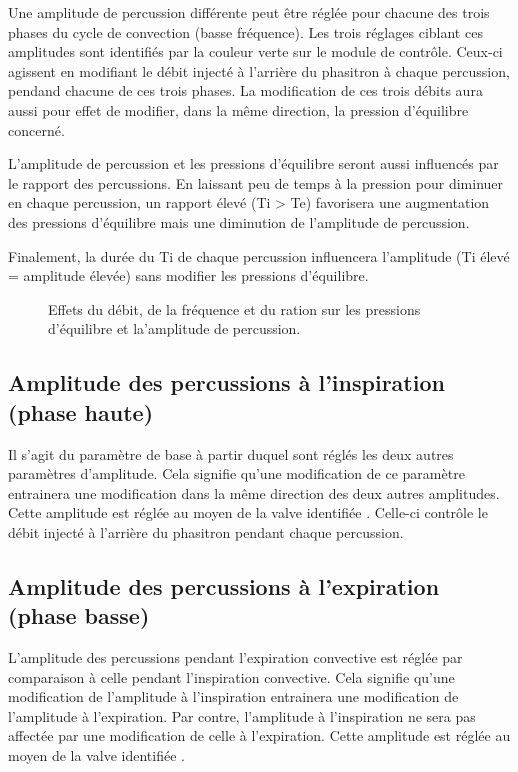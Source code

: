 Une amplitude de percussion différente peut être réglée pour chacune
	des trois phases du cycle de convection (basse fréquence). Les
	trois réglages ciblant ces amplitudes sont identifiés par la couleur
	verte sur le module de contrôle. Ceux-ci agissent en modifiant le
	débit injecté à l'arrière du phasitron à chaque percussion, pendand
	chacune de ces trois phases. La modification de ces trois débits
	aura aussi pour effet de modifier, dans la même direction, la
	pression d'équilibre concerné.

L'amplitude de percussion et les pressions d'équilibre seront aussi
	influencés par le rapport \ie des percussions. En laissant peu de
	temps à la pression pour diminuer en chaque percussion, un rapport
	\ie élevé (Ti > Te) favorisera une augmentation des pressions
	d'équilibre mais une diminution de l'amplitude de percussion.

Finalement, la durée du Ti de chaque percussion influencera
	l'amplitude (Ti élevé = amplitude élevée) sans modifier les
	pressions d'équilibre.

\begin{figure}
	\centering
	
	\caption{Effets du débit, de la fréquence et du ration \ie sur les
	pressions d'équilibre et la'amplitude de percussion.}
\end{figure}

\subsection{Amplitude des percussions à l'inspiration (phase haute)}

Il s'agit du paramètre de base à partir duquel sont réglés les deux
	autres paramètres d'amplitude. Cela signifie qu'une modification de
	ce paramètre entrainera une modification dans la même direction des
	deux autres amplitudes.  Cette amplitude est réglée au moyen de la
	valve identifiée . Celle-ci contrôle le débit
	injecté à l'arrière du phasitron pendant chaque percussion.

\subsection{Amplitude des percussions à l'expiration (phase basse)}

L'amplitude des percussions pendant l'expiration convective est réglée
	par comparaison à celle pendant l'inspiration convective. Cela
	signifie qu'une modification de l'amplitude à l'inspiration
	entrainera une modification de l'amplitude à l'expiration. Par
	contre, l'amplitude à l'inspiration ne sera pas affectée par une
	modification de celle à l'expiration. Cette amplitude est réglée au
	moyen de la valve identifiée .

